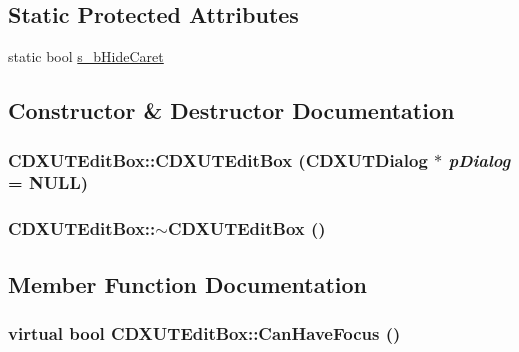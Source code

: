 \subsection*{Static Protected Attributes}
\begin{DoxyCompactItemize}
\item 
static bool \hyperlink{class_c_d_x_u_t_edit_box_af6ee4773c910f27f0b0a4b1d8d47e148}{s\_\-bHideCaret}
\end{DoxyCompactItemize}


\subsection{Constructor \& Destructor Documentation}
\hypertarget{class_c_d_x_u_t_edit_box_ad2626863f3d8863dc7d4107e7282db55}{
\subsubsection[{CDXUTEditBox}]{\setlength{\rightskip}{0pt plus 5cm}CDXUTEditBox::CDXUTEditBox ({\bf CDXUTDialog} $\ast$ {\em pDialog} = {\ttfamily NULL})}}
\label{class_c_d_x_u_t_edit_box_ad2626863f3d8863dc7d4107e7282db55}
\hypertarget{class_c_d_x_u_t_edit_box_a49e591638b55372108780cd926b99f93}{
\subsubsection[{$\sim$CDXUTEditBox}]{\setlength{\rightskip}{0pt plus 5cm}CDXUTEditBox::$\sim$CDXUTEditBox ()}}
\label{class_c_d_x_u_t_edit_box_a49e591638b55372108780cd926b99f93}


\subsection{Member Function Documentation}
\hypertarget{class_c_d_x_u_t_edit_box_a988225899327c419d70d013ed6ab113a}{
\subsubsection[{CanHaveFocus}]{\setlength{\rightskip}{0pt plus 5cm}virtual bool CDXUTEditBox::CanHaveFocus ()}}
\label{class_c_d_x_u_t_edit_box_a988225899327c419d70d013ed6ab113a}


